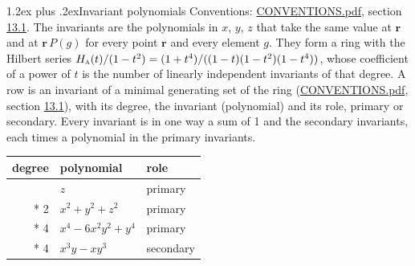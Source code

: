 \documentclass[10pt,a4paper]{article}
\makeatletter
\renewcommand\section{\@startsection{section}{1}{\z@}{-3ex plus -1ex minus -.2ex}%
  {1.2ex plus .2ex}{\normalfont\large\sffamily\bfseries\color{parttitle}}}
\numberwithin{equation}{section}
\newcommand{\irr}[1]{\text{\normalfont\scshape #1}}
\newcommand{\pointr}{\mathbf{r}}
\makeatother
\begin{document}
\section{Invariant polynomials}\label{s:invariant_polynomials}
Conventions: \href{../../CONVENTIONS.pdf}{CONVENTIONS.pdf}, section \href{../../CONVENTIONS.pdf\#conv.13.1}{13.1}.
The invariants are the polynomials in $x$, $y$, $z$ that take the same value at $\pointr$ and at $\pointr\,P(g)$ for every point $\pointr$ and every element $g$. They form a ring with the Hilbert series $H_{\irr{a}}(t)/(1-t^{2}) = (1 + t^{4})/((1-t)(1-t^{2})(1-t^{4}))$, whose coefficient of a power of $t$ is the number of linearly independent invariants of that degree. \label{n:head.degree}\label{n:head.role}A row is an invariant of a minimal generating set of the ring (\href{../../CONVENTIONS.pdf}{CONVENTIONS.pdf}, section \href{../../CONVENTIONS.pdf\#conv.13.1}{13.1}), with its degree, the invariant (polynomial) and its role, primary or secondary. Every invariant is in one way a sum of 1 and the secondary invariants, each times a polynomial in the primary invariants.
{\small\begin{longtable}{@{}rll@{}}\toprule
degree & polynomial & role\\\midrule\endhead
\bottomrule\endfoot\endlastfoot
1 & $z$ & primary\\*
2 & $x^{2} + y^{2} + z^{2}$ & primary\\*
4 & $x^{4} - 6x^{2}y^{2} + y^{4}$ & primary\\*
4 & $x^{3}y - xy^{3}$ & secondary\\
\bottomrule\end{longtable}}
\end{document}
